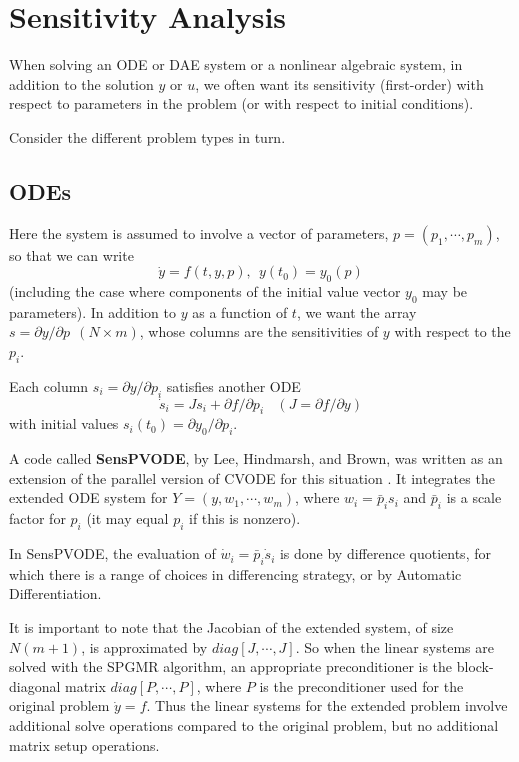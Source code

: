 \section{Sensitivity Analysis}

When solving an ODE or DAE system or a nonlinear algebraic system, in
addition to the solution $y$ or $u$, we often want its sensitivity
(first-order) with respect to parameters in the problem (or with
respect to initial conditions).

Consider the different problem types in turn.

\subsection{ODEs}

Here the system is assumed to involve a vector of parameters,
$p = (p_1,\cdots,p_m)$, so that we can write
\[ \dot{y} = f(t,y,p),~~ y(t_0) = y_0(p) \]
(including the case where components of the initial value vector $y_0$
may be parameters).  In addition to $y$ as a function of $t$, we want
the array $s = \partial y / \partial p ~~ (N \times m)$, whose columns
are the sensitivities of $y$ with respect to the $p_i$.

Each column $s_i = \partial y / \partial p_i$ satisfies another ODE
\[ \dot{s}_i = J s_i + \partial f / \partial p_i ~~~~
               (J = \partial f / \partial y) \]
with initial values $s_i(t_0) = \partial y_0 / \partial p_i$.

A code called {\bf SensPVODE}, by Lee, Hindmarsh, and Brown, was
written as an extension of the parallel version of CVODE for this
situation \cite{SensPV}.  It integrates the extended ODE system for
$Y = (y,w_1,\cdots,w_m)$, where $w_i = \bar{p}_i s_i$ and $\bar{p}_i$
is a scale factor for $p_i$ (it may equal $p_i$ if this is nonzero).

In SensPVODE, the evaluation of $\dot{w}_i = \bar{p}_i \dot{s}_i$ is
done by difference quotients, for which there is a range of choices
in differencing strategy, or by Automatic Differentiation.

It is important to note that the Jacobian of the extended system, of
size $N(m+1)$, is approximated by $diag[J,\cdots,J]$.  So when the
linear systems are solved with the SPGMR algorithm, an appropriate
preconditioner is the block-diagonal matrix $diag[P,\cdots,P]$, where
$P$ is the preconditioner used for the original problem $\dot{y} = f$.
Thus the linear systems for the extended problem involve additional
solve operations compared to the original problem, but no additional
matrix setup operations.

